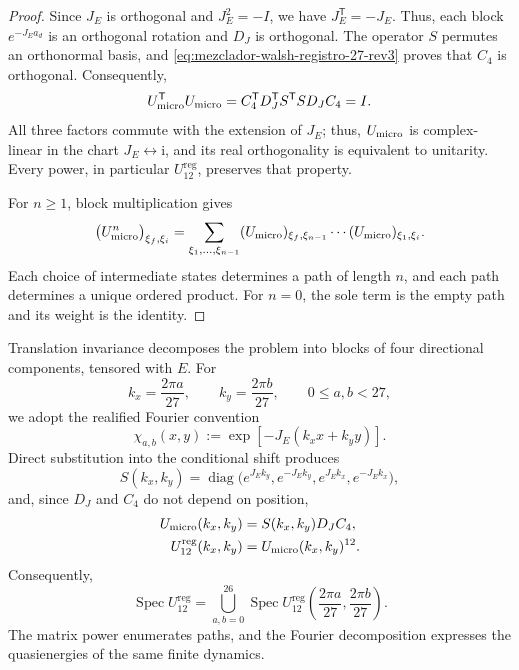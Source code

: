 \begin{proof}
Since \(J_E\) is orthogonal and \(J_E^2=-I\), we have
\(J_E^{\mathsf T}=-J_E\). Thus, each block
\(e^{-J_Ea_d}\) is an orthogonal rotation and \(D_J\) is orthogonal.
The operator \(S\) permutes an orthonormal basis, and
\eqref{eq:mezclador-walsh-registro-27-rev3} proves that \(C_4\) is
orthogonal. Consequently,
\[
 U_{\rm micro}^{\mathsf T}U_{\rm micro}
 =C_4^{\mathsf T}D_J^{\mathsf T}S^{\mathsf T}
   S D_JC_4
 =I.
\]
All three factors commute with the extension of \(J_E\); thus,
\(U_{\rm micro}\) is complex-linear in the chart
\(J_E\leftrightarrow\mathrm i\), and its real orthogonality is equivalent to
unitarity. Every power, in particular
\(U_{12}^{\mathrm{reg}}\), preserves that property.

For \(n\geq1\), block multiplication gives
\[
 \bigl(U_{\rm micro}^{n}\bigr)_{\xi_f,\xi_i}
 =
 \sum_{\xi_1,\ldots,\xi_{n-1}}
 (U_{\rm micro})_{\xi_f,\xi_{n-1}}
 \cdots
 (U_{\rm micro})_{\xi_1,\xi_i}.
\]
Each choice of intermediate states determines a path of length \(n\),
and each path determines a unique ordered product. For \(n=0\), the sole
term is the empty path and its weight is the identity.
\end{proof}

Translation invariance decomposes the problem into blocks of four
directional components, tensored with \(E\). For
\[
 k_x=\frac{2\pi a}{27},
 \qquad
 k_y=\frac{2\pi b}{27},
 \qquad 0\leq a,b<27,
\]
we adopt the realified Fourier convention
\[
 \chi_{a,b}(x,y)
 :=\exp[-J_E(k_xx+k_yy)].
\]
Direct substitution into the conditional shift produces
\[
 S(k_x,k_y)
 =\operatorname{diag}
 \bigl(
  e^{J_Ek_y},e^{-J_Ek_y},
  e^{J_Ek_x},e^{-J_Ek_x}
 \bigr),
\]
and, since \(D_J\) and \(C_4\) do not depend on position,
\begin{equation}
 \begin{aligned}
 U_{\rm micro}(k_x,k_y)
   &=S(k_x,k_y)D_JC_4,\\
 U_{12}^{\mathrm{reg}}(k_x,k_y)
   &=U_{\rm micro}(k_x,k_y)^{12}.
 \end{aligned}
 \label{eq:bloques-fourier-registro-27-rev3}
\end{equation}
Consequently,
\[
 \operatorname{Spec}U_{12}^{\mathrm{reg}}
 =
 \bigcup_{a,b=0}^{26}
 \operatorname{Spec}
 U_{12}^{\mathrm{reg}}
 \left(\frac{2\pi a}{27},\frac{2\pi b}{27}\right).
\]
The matrix power enumerates paths, and the Fourier decomposition expresses
the quasienergies of the same finite dynamics.

